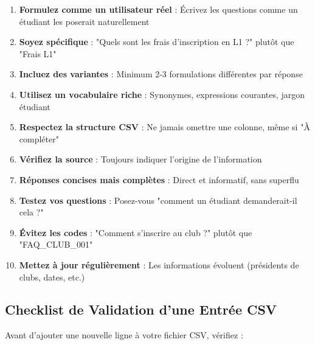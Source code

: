 \documentclass[11pt,a4paper]{article}
\begin{document}
\begin{important}[10 Règles d'Or]
\begin{enumerate}
    \item \textbf{Formulez comme un utilisateur réel} : Écrivez les questions comme un étudiant les poserait naturellement
    
    \item \textbf{Soyez spécifique} : "Quels sont les frais d'inscription en L1 ?" plutôt que "Frais L1"
    
    \item \textbf{Incluez des variantes} : Minimum 2-3 formulations différentes par réponse
    
    \item \textbf{Utilisez un vocabulaire riche} : Synonymes, expressions courantes, jargon étudiant
    
    \item \textbf{Respectez la structure CSV} : Ne jamais omettre une colonne, même si "À compléter"
    
    \item \textbf{Vérifiez la source} : Toujours indiquer l'origine de l'information
    
    \item \textbf{Réponses concises mais complètes} : Direct et informatif, sans superflu
    
    \item \textbf{Testez vos questions} : Posez-vous "comment un étudiant demanderait-il cela ?"
    
    \item \textbf{Évitez les codes} : "Comment s'inscrire au club ?" plutôt que "FAQ\_CLUB\_001"
    
    \item \textbf{Mettez à jour régulièrement} : Les informations évoluent (présidents de clubs, dates, etc.)
\end{enumerate}
\end{important}

\subsection{Checklist de Validation d'une Entrée CSV}

Avant d'ajouter une nouvelle ligne à votre fichier CSV, vérifiez :
\end{document}
